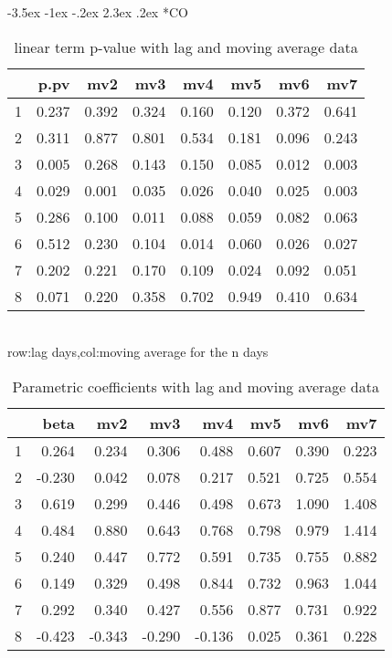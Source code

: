 \documentclass[a4paper, 12pt]{article}
\makeatletter
\def\large{\fontsize{14}{20}\selectfont}
\renewcommand\subsection{\@startsection {subsection}{1}{\z@}%
                                   {-3.5ex \@plus -1ex \@minus -.2ex}%
                                   {2.3ex \@plus.2ex}%
                                   {\centering\normalfont\large\bfseries}}
\makeatother
\begin{document}
\subsection*{CO}
\begin{table}[h]
\centering
\caption{linear term p-value with lag and moving average data}
\begin{tabular}{rrrrrrrr}
  \hline
 & p.pv & mv2 & mv3 & mv4 & mv5 & mv6 & mv7 \\
  \hline
1 & 0.237 & 0.392 & 0.324 & 0.160 & 0.120 & 0.372 & 0.641 \\
  2 & 0.311 & 0.877 & 0.801 & 0.534 & 0.181 & 0.096 & 0.243 \\
  3 & 0.005 & 0.268 & 0.143 & 0.150 & 0.085 & 0.012 & 0.003 \\
  4 & 0.029 & 0.001 & 0.035 & 0.026 & 0.040 & 0.025 & 0.003 \\
  5 & 0.286 & 0.100 & 0.011 & 0.088 & 0.059 & 0.082 & 0.063 \\
  6 & 0.512 & 0.230 & 0.104 & 0.014 & 0.060 & 0.026 & 0.027 \\
  7 & 0.202 & 0.221 & 0.170 & 0.109 & 0.024 & 0.092 & 0.051 \\
  8 & 0.071 & 0.220 & 0.358 & 0.702 & 0.949 & 0.410 & 0.634 \\
   \hline
\end{tabular}
\\row:lag days,col:moving average for the n days
\end{table}
\begin{table}[h]
\centering
\caption{Parametric coefficients with lag and moving average data}
\begin{tabular}{rrrrrrrr}
  \hline
 & beta & mv2 & mv3 & mv4 & mv5 & mv6 & mv7 \\
  \hline
1 & 0.264 & 0.234 & 0.306 & 0.488 & 0.607 & 0.390 & 0.223 \\
  2 & -0.230 & 0.042 & 0.078 & 0.217 & 0.521 & 0.725 & 0.554 \\
  3 & 0.619 & 0.299 & 0.446 & 0.498 & 0.673 & 1.090 & 1.408 \\
  4 & 0.484 & 0.880 & 0.643 & 0.768 & 0.798 & 0.979 & 1.414 \\
  5 & 0.240 & 0.447 & 0.772 & 0.591 & 0.735 & 0.755 & 0.882 \\
  6 & 0.149 & 0.329 & 0.498 & 0.844 & 0.732 & 0.963 & 1.044 \\
  7 & 0.292 & 0.340 & 0.427 & 0.556 & 0.877 & 0.731 & 0.922 \\
  8 & -0.423 & -0.343 & -0.290 & -0.136 & 0.025 & 0.361 & 0.228 \\
   \hline
\end{tabular}
\end{table}
\clearpage
\end{document}
